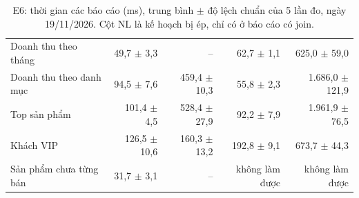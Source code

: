 \begin{table}[!htbp]
\centering
\caption{E6: thời gian các báo cáo (ms), trung bình $\pm$ độ lệch chuẩn của 5 lần đo, ngày 19/11/2026. Cột NL là kế hoạch bị ép, chỉ có ở báo cáo có join.}\label{tab:q-bench}
\reporttablesetup
\begin{tabularx}{\linewidth}{|L|r|r|r|r|}
\hline
{}
 &  &  &  &  \\ \hline
Doanh thu theo tháng & 49,7 $\pm$ 3,3 & -- & 62,7 $\pm$ 1,1 & 625,0 $\pm$ 59,0 \\ \hline
Doanh thu theo danh mục & 94,5 $\pm$ 7,6 & 459,4 $\pm$ 10,3 & 55,8 $\pm$ 2,3 & 1.686,0 $\pm$ 121,9 \\ \hline
Top sản phẩm & 101,4 $\pm$ 4,5 & 528,4 $\pm$ 27,9 & 92,2 $\pm$ 7,9 & 1.961,9 $\pm$ 76,5 \\ \hline
Khách VIP & 126,5 $\pm$ 10,6 & 160,3 $\pm$ 13,2 & 192,8 $\pm$ 9,1 & 673,7 $\pm$ 44,3 \\ \hline
Sản phẩm chưa từng bán & 31,7 $\pm$ 3,1 & -- & không làm được & không làm được \\ \hline
\end{tabularx}
\end{table}

